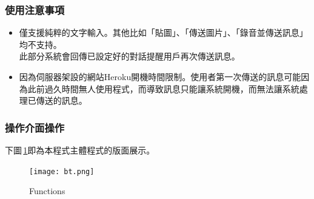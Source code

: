 \documentclass{beamer}
\begin{document}
\begin{CJK}{UTF8}{<font>}

\begin{frame}
\frametitle{使用注意事項}
\begin{itemize}
\item 僅支援純粹的文字輸入。其他比如「貼圖」、「傳送圖片」、「錄音並傳送訊息」均不支持。\\
此部分系統會回傳已設定好的對話提醒用戶再次傳送訊息。
\item 因為伺服器架設的網站Heroku開機時間限制。使用者第一次傳送的訊息可能因為此前過久時間無人使用程式，而導致訊息只能讓系統開機，而無法讓系統處理已傳送的訊息。
\end{itemize}

\end{frame}

\begin{frame}
\frametitle{操作介面操作}
下圖\,\ref{fig:3}即為本程式主體程式的版面展示。
\begin{figure}
\texttt{[image: bt.png]}
\caption{Functions}
\label{fig:3}
\end{figure}

\end{frame}

\begin {comment}
\begin{frame}
\frametitle{Blocks of Highlighted Text}
\begin{block}{Block 1}
Lorem ipsum dolor sit amet, consectetur adipiscing elit. Integer lectus nisl, ultricies in feugiat rutrum, porttitor sit amet augue. Aliquam ut tortor mauris. Sed volutpat ante purus, quis accumsan dolor.
\end{block}

\begin{block}{Block 2}
Pellentesque sed tellus purus. Class aptent taciti sociosqu ad litora torquent per conubia nostra, per inceptos himenaeos. Vestibulum quis magna at risus dictum tempor eu vitae velit.
\end{block}

\begin{block}{Block 3}
Suspendisse tincidunt sagittis gravida. Curabitur condimentum, enim sed venenatis rutrum, ipsum neque consectetur orci, sed blandit justo nisi ac lacus.
\end{block}
\end{frame}
\end{comment}


\end{CJK}
\end{document}

